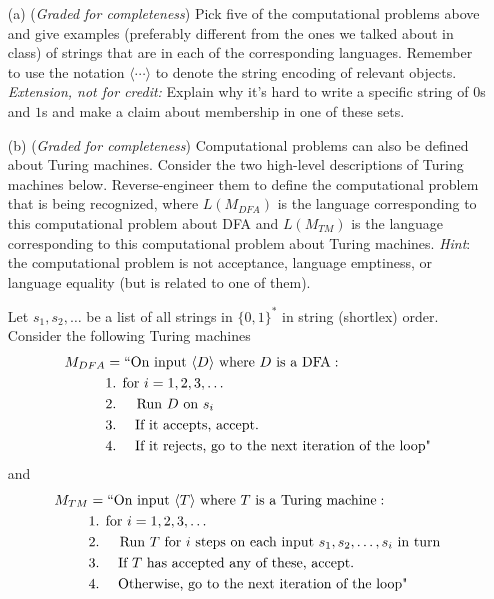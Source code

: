 \documentclass[12pt, oneside]{article}
\newcommand{\gradeComplete}{({\it Graded for completeness}) }
\begin{document}
\begin{enumerate}[wide, labelwidth=!, labelindent=0pt]
\begin{enumerate}
    \item[(a)] \gradeComplete Pick five of the computational problems above and give 
    examples (preferably different from the ones we talked about in class) of strings that are
    in each of the corresponding languages. Remember to use the 
    notation $\langle \cdots \rangle$ to denote the string encoding of relevant objects.
    {\it Extension, not for credit:} Explain why it's hard to write a specific string of 
    $0$s and $1$s and make a claim about membership in one of these sets.
    \item[(b)] \gradeComplete Computational problems can also be defined about Turing machines.
    Consider the two high-level descriptions of Turing machines below.
    Reverse-engineer them to define the computational problem that is being
    recognized, where $L(M_{DFA})$ is the language corresponding to this computational
    problem about DFA and $L(M_{TM})$ is the language corresponding to this computational
    problem about Turing machines. {\it Hint}: the computational problem is not acceptance,
    language emptiness, or language equality (but is related to one of them).

    Let $s_1, s_2, \ldots$ be a list of all strings in 
    $\{0,1\}^*$ in string (shortlex) order. Consider the following Turing machines
    \begin{align*}
        M_{DFA} &= ``\text{On input $\langle D \rangle$ where $D$ is a DFA}:\\
         &\text{1. for $i=1, 2, 3, \ldots$} \\
         &\text{2.~~~ Run $D$ on $s_i$} \\
         &\text{3.~~~~If it accepts, accept.}\\
         &\text{4.~~~~If it rejects, go to the next iteration of the loop"}\\
     \end{align*}
     and
     \begin{align*}
        M_{TM} &= ``\text{On input $\langle T \rangle$ where $T$ is a Turing machine}:\\
         &\text{1. for $i=1, 2, 3, \ldots$} \\
         &\text{2.~~~ Run $T$ for $i$ steps on each input $s_1, s_2, \ldots, s_i$ in turn} \\
         &\text{3.~~~~If $T$ has accepted any of these, accept.}\\
         &\text{4.~~~~Otherwise, go to the next iteration of the loop"}\\
     \end{align*}
\end{enumerate}


\end{enumerate}
\newpage
\titleformat{\subsubsection}[runin]
   {\normalfont\bfseries}{}{}{}
   
\end{document}
